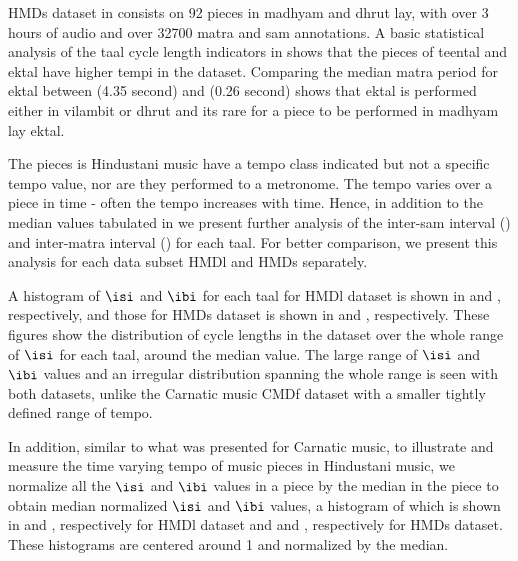 \acrshort{HMDs} dataset in  consists on 92 pieces in \gls{madhyam} and \gls{dhrut} \gls{lay}, with over 3 hours of audio and over 32700 \gls{matra} and \gls{sam} annotations. A basic statistical analysis of the \gls{taal} cycle length indicators in  shows that the pieces of \gls{teental} and \gls{ektal} have higher tempi in the dataset. Comparing the median \gls{matra} period for \gls{ektal} between  (4.35 second) and  (0.26 second) shows that \gls{ektal} is performed either in \gls{vilambit} or \gls{dhrut} and its rare for a piece to be performed in \gls{madhyam} \gls{lay} \gls{ektal}.

The pieces is Hindustani music have a tempo class indicated but not a specific tempo value, nor are they performed to a metronome. The tempo varies over a piece in time - often the tempo increases with time. Hence, in addition to the median values tabulated in  we present further analysis of the inter-\gls{sam} interval (\isi) and inter-\gls{matra} interval (\ibi) for each \gls{taal}. For better comparison, we present this analysis for each data subset \acrshort{HMDl} and \acrshort{HMDs} separately. 

A histogram of $\isi$ and $\ibi$ for each \gls{taal} for \acrshort{HMDl} dataset is shown in  and , respectively, and those for \acrshort{HMDs} dataset is shown in  and , respectively. These figures show the distribution of cycle lengths in the dataset over the whole range of $\isi$ for each \gls{taal}, around the median value. The large range of $\isi$ and $\ibi$ values and an irregular distribution spanning the whole range is seen with both datasets, unlike the Carnatic music \acrshort{CMDf} dataset with a smaller tightly defined range of tempo. 

In addition, similar to what was presented for Carnatic music, to illustrate and measure the time varying tempo of music pieces in Hindustani music, we normalize all the $\isi$ and $\ibi$ values in a piece by the median in the piece to obtain median normalized $\isi$ and $\ibi$ values, a histogram of which is shown in  and , respectively for \acrshort{HMDl} dataset and  and , respectively for \acrshort{HMDs} dataset. These histograms are centered around 1 and normalized by the median. 

